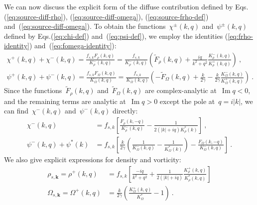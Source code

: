 \documentclass[preprint,aps,eqsecnum]{revtex4-1}
\newcommand{\fplus}[1]{{#1}^{+}}
\newcommand{\fminus}[1]{{#1}^{-}}
\newcommand{\fplusminus}[1]{{#1}^{\pm}}
\renewcommand{\Im}{\mathop{\mathrm{Im}}\nolimits}
\begin{document}
We can now discuss the explicit form of the diffuse contribution  
defined by Eqs.(\ref{eq:source-diff-rho}), (\ref{eq:source-diff-omega}),
(\ref{eq:source-frho-def}) and~(\ref{eq:source-diff-omega}). To obtain the
functions~$\fplusminus{\chi}(k, q)$ and~$\fplusminus{\psi}(k, q)$ defined
by Eqs.(\ref{eq:chi-def}) and~(\ref{eq:psi-def}), we employ
the identities (\ref{eq:frho-identity}) and~(\ref{eq:fomega-identity}):
\begin{align}
  \fplus{\chi}(k, q) + \fminus{\chi}(k, q)
   = \frac{f_{s, k} F_\rho(k, q)}{\fminus{K}_\rho(k, q)}
  = \frac{f_{s, k}}{\fminus{K}_\rho(k, q)} \left( \tilde{F}_\rho(k, q)
      + \frac{iq}{k^2 + q^2} \frac{\fminus{K}_\rho(k, q)}{\fplus{K}_\rho(k, q)}\right)
  \ ,
\\
\fplus{\psi}(k, q) + \fminus{\psi}(k, q)
= \frac{f_{s, k} F_\Omega(k, q)}{\fminus{K}_\Omega(k, q)}
= \frac{f_{s, k}}{\fminus{K}_\Omega(k, q)} \left( - \tilde{F}_\Omega(k, q)
      + \frac{k}{2\gamma}
      - \frac{k}{2\gamma}\frac{\fminus{K}_\Omega(k, q)}{\fplus{K}_\Omega(k, q)}\right)
\ .
\end{align}
Since the functions~$\tilde{F}_\rho(k, q)$ and~$\tilde{F}_\Omega(k, q)$
are complex-analytic at~$\Im q < 0$, and the remaining terms are analytic
at~$\Im q > 0$ except the pole at~$q = i |k|$,
we can find~$\fminus{\chi}(k, q)$ and~$\fminus{\psi}(k, q)$ directly:
\begin{align}
  \fminus{\chi}(k, q) &= f_{s, k} \left[
  \frac{{F}_\rho(k, -q)}{\fminus{K}_\rho(k, q)}
  - \frac{1}{2(|k| + iq) K_\rho^\ast(k)}
  \right]
  \ ,
  \\
  \fminus{\psi}(k, q) + \psi^\ast(k)
  &= f_{s, k}\left[\frac{k}{2\gamma} \left(\frac{1}{\fminus{K}_\Omega(k, q)}
  - \frac{1}{K_\Omega^\ast(k)} \right)
   - \frac{F_\Omega(k, -q)}{\fminus{K}_\Omega(k, q)}  \right]
  \ .
\end{align}
We also give explicit expressions for density and vorticity:
\begin{align}
  \label{eq:rho-s}
  \rho_{s, {\bm k}} = \fplus{\rho}(k, q) &= f_{s, k} \left[\frac{-iq}{k^2 + q^2}
  + \frac{1}{2(|k| + iq)} \frac{\fplus{K}_\rho(k, q)}{K_\rho^\ast(k, q)} \right]
  \\
   \label{eq:omega-s}
  \Omega_{s, {\bm k}} = \fplus{\Omega}(k, q)
  &= \frac{k}{2\gamma}
     \left(\frac{\fplus{K}_\Omega(k, q)}{K_\Omega^\ast} - 1\right)
  \ .
\end{align}
\end{document}
